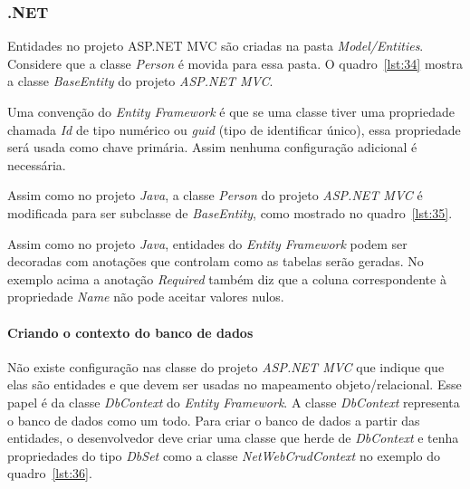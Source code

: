 \documentclass[a4paper,12pt]{article}
\newcommand{\est}[1] {
\textit{#1}}
\newcommand{\classe}[1] {
\textit{#1}}
\newcommand{\arquivo}[1] {
\textit{#1}}
\newcommand{\lang}[1] {
\textit{#1}}
\newcommand{\annotation}[1] {
\textit{#1}}
\newcommand{\javacode}[3] {
	
}
\newcommand{\sharpcode}[3] {
	
}
\begin{document}
\subsubsection{.NET}

Entidades no projeto ASP.NET MVC são criadas na pasta \arquivo{Model/Entities}. Considere que a classe \classe{Person} é movida para essa pasta. O quadro~\ref{lst:34} mostra a classe \classe{BaseEntity} do projeto \est{ASP.NET MVC}.

\javacode{code/34.txt}{Classe \classe{BaseEntity} no projeto \est{ASP.NET}}{lst:34}

Uma convenção do \est{Entity Framework} é que se uma classe tiver uma propriedade chamada \est{Id} de tipo numérico ou \est{guid} (tipo de identificar único), essa propriedade será usada como chave primária. Assim nenhuma configuração adicional é necessária.

Assim como no projeto \lang{Java}, a classe \classe{Person} do projeto \est{ASP.NET MVC} é modificada para ser subclasse de \classe{BaseEntity}, como mostrado no quadro~\ref{lst:35}.

\javacode{code/35.txt}{Classe \classe{Person} no projeto \est{ASP.NET} agora herda de \classe{BaseEntity}}{lst:35}

Assim como no projeto \lang{Java}, entidades do \est{Entity Framework} podem ser decoradas com anotações que controlam como as tabelas serão geradas. No exemplo acima a anotação \annotation{Required} também diz que a coluna correspondente à propriedade \est{Name} não pode aceitar valores nulos.

\paragraph{Criando o contexto do banco de dados}

Não existe configuração nas classe do projeto \est{ASP.NET MVC} que indique que elas são entidades e que devem ser usadas no mapeamento objeto/relacional. Esse papel é da classe \classe{DbContext} do \est{Entity Framework}. A classe \classe{DbContext} representa o banco de dados como um todo. Para criar o banco de dados a partir das entidades, o desenvolvedor deve criar uma classe que herde de \classe{DbContext} e tenha propriedades do tipo \classe{DbSet} como a classe \classe{NetWebCrudContext} no exemplo do quadro~\ref{lst:36}. 

\sharpcode{code/36.txt}{Classe \classe{NetWebCrudContext} representa o contexto do banco de dados}{lst:36}
\end{document}
